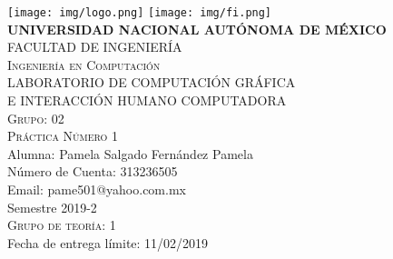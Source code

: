 \documentclass[12pt, a4paper]{article}
\begin{document}
	
	\begin{titlepage}
		
		\newcommand{\HRule}{\rule{\linewidth}{0.5mm}} %
		
		\centering %
		
		
		\texttt{[image: img/logo.png]} %
		\hspace{4cm}
		\texttt{[image: img/fi.png]}\\[.65cm] %
		
		\textsc{\large \bfseries UNIVERSIDAD NACIONAL AUTÓNOMA DE MÉXICO}\\[.5cm] %
		\textsc{\large FACULTAD DE INGENIERÍA}\\[0.5cm] %
		\textsc{\large Ingeniería en Computación}\\[1.4 cm] %
		
		{\large LABORATORIO DE COMPUTACIÓN GRÁFICA\\ E INTERACCIÓN HUMANO COMPUTADORA}\\[.4 cm] %
		\textsc{\large Grupo: 02}\\[1.5 cm]
		\textsc{\large Práctica Número 1}\\[1.5 cm]
		{\large Alumna: Pamela Salgado Fernández Pamela}\\[.3 cm]
		{\large Número de Cuenta: 313236505}\\[.3 cm]
		{\large Email: pame501@yahoo.com.mx}\\[1.6 cm]
		\raggedleft 
		{\large Semestre 2019-2}\\[.3 cm]
		\textsc{\large Grupo de teoría: 1}\\[.3 cm]
		{\large Fecha de entrega límite: 11/02/2019}\\[.5 cm] 

		
		\vfill %
		 
		
	\end{titlepage}
	\tableofcontents
	\newpage
	\noindent
	
\end{document}
